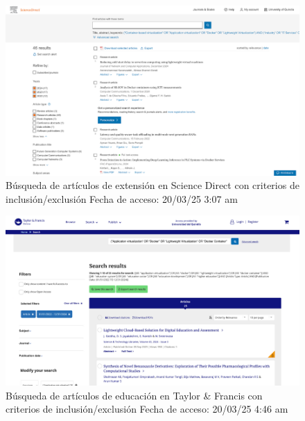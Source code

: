\FloatBarrier\begin{figure}[htbp]
    \centering
    \includegraphics[width=\textwidth,keepaspectratio]{apendices/BD/criterios/SD-ind.png}
    \caption{Búsqueda de artículos de extensión en Science Direct con criterios de inclusión/exclusión
    Fecha de acceso: 20/03/25 3:07 am
    }\label{fig:busqueda27}
\end{figure}
\FloatBarrier\begin{figure}[htbp]
    \centering
    \includegraphics[width=\textwidth,keepaspectratio]{apendices/BD/criterios/TF-ed.png}
    \caption{Búsqueda de artículos de educación en Taylor \& Francis con criterios de inclusión/exclusión
    Fecha de acceso: 20/03/25 4:46 am
    }\label{fig:busqueda28}
\end{figure}
